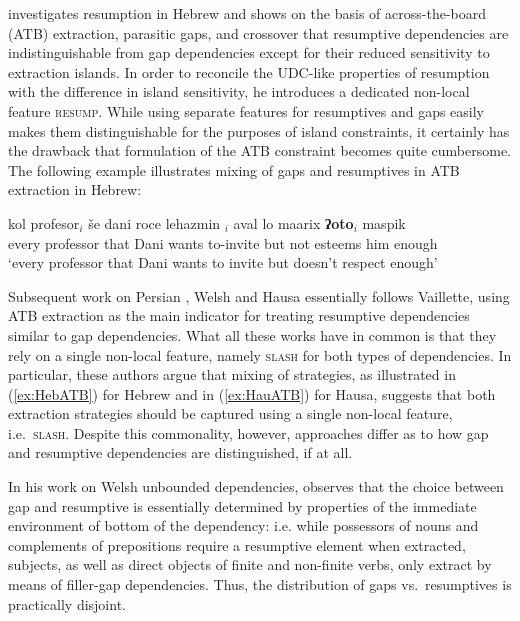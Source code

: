 \documentclass[output=paper
                ,modfonts
                ,nonflat
	        ,collection
	        ,collectionchapter
	        ,collectiontoclongg
 	        ,biblatex
                ,babelshorthands
                ,newtxmath
                ,draftmode
                ,colorlinks, citecolor=brown
]{./langsci/langscibook}
\begin{document}
{\citet{Vaillette:01} investigates resumption in Hebrew and shows on
the basis of across-the-board (ATB) extraction, parasitic gaps, and
crossover that resumptive dependencies are indistinguishable from gap
dependencies except for their reduced sensitivity to extraction
islands. In order to reconcile the UDC-like properties of resumption
with the difference in island sensitivity, he introduces a dedicated
non-local feature \textsc{resump}. While using separate features for
resumptives and gaps easily makes them distinguishable for the
purposes of island constraints, it certainly has the drawback that
formulation of the ATB constraint becomes quite cumbersome.
The following example illustrates mixing of gaps and resumptives in
ATB extraction in Hebrew: 

\begin{exe}
  \ex \label{ex:HebATB}{\gll kol
profesor$_i$ še dani roce lehazmin \trace{}$_i$ aval lo maarix \textbf{ʔoto}$_i$ maspik
\\
every professor that Dani wants to-invite {} but not
esteems him enough\\
\glt `every professor that Dani wants to invite but doesn’t respect
enough'\hfill\citep[78]{sells_p84}}
\end{exe}

\noindent
Subsequent work on Persian \citep{taghvaipour:phd:05}, Welsh
\citep{Borsley:13} and Hausa \citep{Crysmann:12} essentially follows
Vaillette, using ATB extraction as the main indicator for treating
resumptive dependencies similar to gap dependencies. What all these
works have in common is that they rely on a single non-local
feature, namely \textsc{slash} for both types of dependencies. In
particular, these authors argue that mixing of strategies, as
illustrated in (\ref{ex:HebATB}) for Hebrew and in (\ref{ex:HauATB})
for Hausa, suggests that both extraction
strategies should be captured using a single non-local feature,
i.e.\ \textsc{slash}. Despite this commonality, however, approaches
differ as to how gap and resumptive dependencies are distinguished, if
at all.

In his work on Welsh unbounded dependencies, \citet{Borsley:10}
observes that the choice between gap and resumptive is essentially
determined by properties of the immediate environment of bottom of the
dependency: i.e. while possessors of nouns and complements of
prepositions require a resumptive element when extracted, subjects, as
well as direct objects of finite and non-finite verbs, only extract by
means of filler-gap dependencies. Thus, the distribution of gaps vs.\
resumptives is practically disjoint.

}
\end{document}
